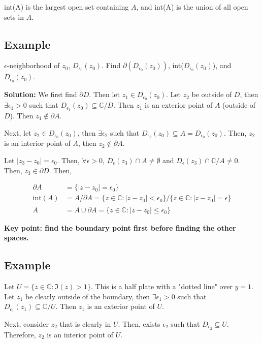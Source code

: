 \documentclass{article}
\newtheorem{one minute paper}[theorem]{One Minute Paper}
\begin{document}
int(A) is the largest open set containing $A$, and int(A) is the union of all open sets in $A$. 

\subsection*{Example}

$\epsilon$-neighborhood of $z_0$, $D_{\epsilon_0}(z_0)$. Find $\partial (D_{\epsilon_0}(z_0))$, int($D_{\epsilon_0}(z_0)$), and $\overline{D_{\epsilon_0}(z_0)}$. 

\textbf{Solution:} We first find $\partial D$. Then let $z_1 \in D_{\epsilon_0}(z_0)$. Let $z_2$ be outside of $D$, then $\exists \epsilon_1 > 0$ such that $D_{\epsilon_1}(z_0) \subseteq \mathbb{C}/D$. Then $z_1$ is an exterior point of $A$ (outside of $D$). Then $z_1 \notin \partial A$. 

Next, let $z_2 \in D_{\epsilon_0}(z_0)$, then $\exists \epsilon_2$ such that $D_{\epsilon_2}(z_0) \subseteq A = D_{\epsilon_0}(z_0)$. Then, $z_2$ is an interior point of $A$, then $z_2 \notin \partial A$. 

Let $|z_3 - z_0| = \epsilon_0$. Then, $\forall \epsilon > 0$, $D_{\epsilon}(z_3) \cap A \neq \emptyset$ and $D_{\epsilon}(z_3) \cap \mathbb{C}/ A \neq 0$. Then, $z_3 \in \partial D$. Then, 

\begin{align}
    \partial A &= \{|z - z_0| = \epsilon_0\} \\
    \text{int}(A) &= A/\partial A = \{z \in \mathbb{C}: |z - z_0| < \epsilon_0\}/\{z \in \mathbb{C}: |z - z_0| = \epsilon\}\\
    \overline{A} &= A \cup \partial A = \{z \in \mathbb{C}: |z - z_0| \leq \epsilon_0\}
\end{align}

\textbf{Key point: find the boundary point first before finding the other spaces.}

\subsection*{Example}

Let $U = \{z \in \mathbb{C}: \Im(z) > 1\}$. This is a half plate with a "dotted line" over $y=1$. Let $z_1$ be clearly outside of the boundary, then $\exists \epsilon_1 > 0$ such that $D_{\epsilon_1}(z_1) \subseteq \mathbb{C}/U$. Then $z_1$ is an exterior point of $U$. 

Next, consider $z_2$ that is clearly in $U$. Then, exists $\epsilon_2$ such that $D_{\epsilon_2} \subseteq U$. Therefore, $z_2$ is an interior point of $U$.
\end{document}

